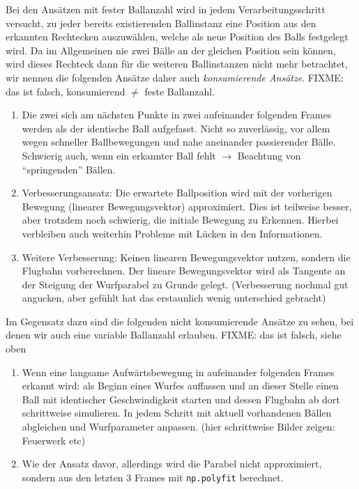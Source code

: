 \documentclass[12pt,a4paper,ngerman]{scrartcl}
\begin{document}
Bei den Ansätzen mit fester Ballanzahl wird in jedem Verarbeitungsschritt versucht,
zu jeder bereits existierenden Ballinstanz eine Position aus den erkannten Rechtecken
auszuwählen, welche als neue Position des Balls festgelegt wird. Da im Allgemeinen nie
zwei Bälle an der gleichen Position sein können, wird dieses Rechteck dann für die weiteren Ballinstanzen nicht mehr betrachtet, wir nennen die folgenden Ansätze daher
auch \textit{konsumierende Ansätze}. FIXME: das ist falsch, konsumierend $\neq$ feste Ballanzahl.

 \begin{enumerate}
 \item Die zwei sich am nächsten Punkte in zwei aufeinander folgenden Frames werden als der identische Ball aufgefasst. Nicht so zuverlässig, vor allem wegen schneller Ballbewegungen und nahe aneinander passierender Bälle. Schwierig auch, wenn ein erkannter Ball fehlt $\rightarrow$ Beachtung von ``springenden'' Bällen.
 \item Verbesserungsansatz: Die erwartete Ballposition wird mit der vorherigen Bewegung (linearer Bewegungsvektor) approximiert. Dies ist teilweise besser, aber trotzdem noch schwierig, die initiale Bewegung zu Erkennen. Hierbei verbleiben auch weiterhin Probleme mit Lücken in den Informationen.
 \item Weitere Verbesserung: Keinen linearen Bewegungsvektor nutzen, sondern die Flugbahn vorberechnen. Der lineare Bewegungsvektor wird als Tangente an der Steigung der Wurfparabel zu Grunde gelegt. (Verbesserung nochmal gut angucken, aber gefühlt hat das erstaunlich wenig unterschied gebracht)
 \end{enumerate}


Im Gegensatz dazu sind die folgenden nicht konsumierende Ansätze zu sehen, bei denen
wir auch eine variable Ballanzahl erlauben. FIXME: das ist falsch, siehe oben

\begin{enumerate}
	\item Wenn eine langsame Aufwärtsbewegung in aufeinander folgenden Frames erkannt wird: als Beginn eines Wurfes auffassen und an dieser Stelle einen Ball mit identischer Geschwindigkeit starten und dessen Flugbahn ab dort schrittweise simulieren. In jedem Schritt mit aktuell vorhandenen Bällen abgleichen und Wurfparameter anpassen. (hier schrittweise Bilder zeigen: Feuerwerk etc)
	\item Wie der Ansatz davor, allerdings wird die Parabel nicht approximiert, sondern	aus den letzten 3 Frames mit \lstinline{np.polyfit} berechnet.
\end{enumerate}
\end{document}
